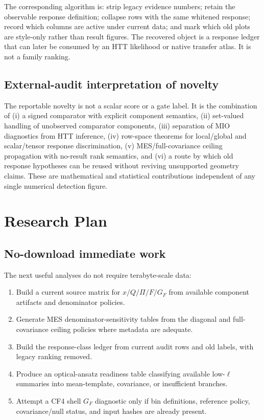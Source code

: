 \documentclass[11pt]{article}
\newcommand{\GF}{G_F}
\begin{document}
The corresponding algorithm is: strip legacy evidence numbers; retain the observable response definition; collapse rows with the same whitened response; record which columns are active under current data; and mark which old plots are style-only rather than result figures.  The recovered object is a response ledger that can later be consumed by an HTT likelihood or native transfer atlas.  It is not a family ranking.

\subsection{External-audit interpretation of novelty}
The reportable novelty is not a scalar score or a gate label.  It is the combination of (i) a signed comparator with explicit component semantics, (ii) set-valued handling of unobserved comparator components, (iii) separation of MIO diagnostics from HTT inference, (iv) row-space theorems for local/global and scalar/tensor response discrimination, (v) MES/full-covariance ceiling propagation with no-result rank semantics, and (vi) a route by which old response hypotheses can be reused without reviving unsupported geometry claims.  These are mathematical and statistical contributions independent of any single numerical detection figure.

\section{Research Plan}
\subsection{No-download immediate work}
The next useful analyses do not require terabyte-scale data:
\begin{enumerate}
  \item Build a current source matrix for \(x/Q/\Pi/F/\GF\) from available component artifacts and denominator policies.
  \item Generate MES denominator-sensitivity tables from the diagonal and full-covariance ceiling policies where metadata are adequate.
  \item Build the response-class ledger from current audit rows and old labels, with legacy ranking removed.
  \item Produce an optical-ansatz readiness table classifying available low-\(\ell\) summaries into mean-template, covariance, or insufficient branches.
  \item Attempt a CF4 shell \(\GF\) diagnostic only if bin definitions, reference policy, covariance/null status, and input hashes are already present.
\end{enumerate}
\end{document}
